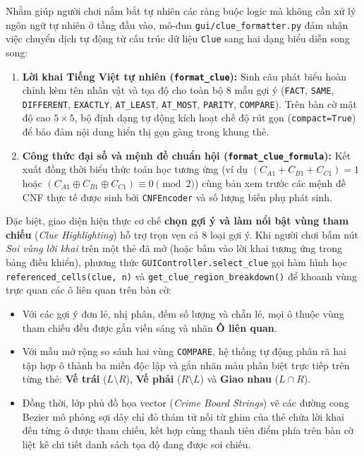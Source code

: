 Nhằm giúp người chơi nắm bắt tự nhiên các ràng buộc logic mà không cần xử lý ngôn ngữ tự nhiên ở tầng đầu vào, mô-đun \texttt{gui/clue\_formatter.py} đảm nhận việc chuyển dịch tự động từ cấu trúc dữ liệu \texttt{Clue} sang hai dạng biểu diễn song song:
\begin{enumerate}
    \item \textbf{Lời khai Tiếng Việt tự nhiên (\texttt{format\_clue}):} Sinh câu phát biểu hoàn chỉnh kèm tên nhân vật và tọa độ cho toàn bộ 8 mẫu gợi ý (\texttt{FACT}, \texttt{SAME}, \texttt{DIFFERENT}, \texttt{EXACTLY}, \texttt{AT\_LEAST}, \texttt{AT\_MOST}, \texttt{PARITY}, \texttt{COMPARE}). Trên bàn cờ mật độ cao $5 \times 5$, bộ định dạng tự động kích hoạt chế độ rút gọn (\texttt{compact=True}) để bảo đảm nội dung hiển thị gọn gàng trong khung thẻ.
    \item \textbf{Công thức đại số và mệnh đề chuẩn hội (\texttt{format\_clue\_formula}):} Kết xuất đồng thời biểu thức toán học tương ứng (ví dụ $(C_{A1} + C_{B1} + C_{C1}) = 1$ hoặc $(C_{A1} \oplus C_{B1} \oplus C_{C1}) \equiv 0 \pmod 2$) cùng bản xem trước các mệnh đề CNF thực tế được sinh bởi \texttt{CNFEncoder} và số lượng biến phụ phát sinh.
\end{enumerate}

Đặc biệt, giao diện hiện thực cơ chế \textbf{chọn gợi ý và làm nổi bật vùng tham chiếu} (\emph{Clue Highlighting}) hỗ trợ trọn vẹn cả 8 loại gợi ý. Khi người chơi bấm nút \emph{Soi vùng lời khai} trên một thẻ đã mở (hoặc bấm vào lời khai tương ứng trong bảng điều khiển), phương thức \texttt{GUIController.select\_clue} gọi hàm hình học \texttt{referenced\_cells(clue, n)} và \texttt{get\_clue\_region\_breakdown()} để khoanh vùng trực quan các ô liên quan trên bàn cờ:
\begin{itemize}
    \item Với các gợi ý đơn lẻ, nhị phân, đếm số lượng và chẵn lẻ, mọi ô thuộc vùng tham chiếu đều được gắn viền sáng và nhãn \textbf{Ô liên quan}.
    \item Với mẫu mở rộng so sánh hai vùng \texttt{COMPARE}, hệ thống tự động phân rã hai tập hợp ô thành ba miền độc lập và gắn nhãn màu phân biệt trực tiếp trên từng thẻ: \textbf{Vế trái} ($L \setminus R$), \textbf{Vế phải} ($R \setminus L$) và \textbf{Giao nhau} ($L \cap R$).
    \item Đồng thời, lớp phủ đồ họa vector (\emph{Crime Board Strings}) vẽ các đường cong Bezier mô phỏng sợi dây chỉ đỏ thám tử nối từ ghim của thẻ chứa lời khai đến từng ô được tham chiếu, kết hợp cùng thanh tiêu điểm phía trên bàn cờ liệt kê chi tiết danh sách tọa độ đang được soi chiếu.
\end{itemize}

